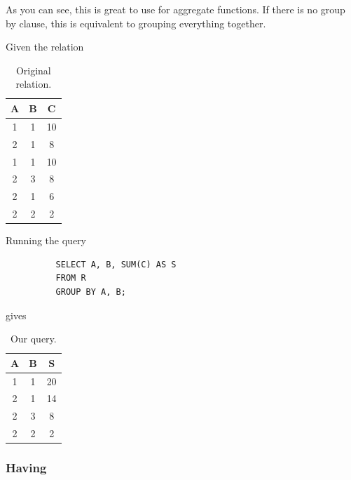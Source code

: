 \documentclass{article}
\begin{document}
      As you can see, this is great to use for aggregate functions. If there is no group by clause, this is equivalent to grouping everything together.  

      \begin{example}
        Given the relation 

        \begin{table}[H]
          \centering
          \begin{tabular}{|c|c|c|}
            \hline
            \textbf{A} & \textbf{B} & \textbf{C} \\
            \hline
            1 & 1 & 10 \\ 
            2 & 1 & 8 \\ 
            1 & 1 & 10 \\ 
            2 & 3 & 8 \\ 
            2 & 1 & 6 \\ 
            2 & 2 & 2 \\ 
            \hline
          \end{tabular}
          \caption{Original relation. }
          \label{tab:groupby}
        \end{table}
      
        Running the query 
        \begin{lstlisting}
          SELECT A, B, SUM(C) AS S 
          FROM R 
          GROUP BY A, B; 
        \end{lstlisting}
        gives 
        
        \begin{table}[H]
          \centering
          \begin{tabular}{|c|c|c|}
            \hline
            \textbf{A} & \textbf{B} & \textbf{S} \\
            \hline
            1 & 1 & 20 \\ 
            2 & 1 & 14 \\ 
            2 & 3 & 8 \\ 
            2 & 2 & 2 \\ 
            \hline
          \end{tabular}
          \caption{Our query. }
          \label{tab:groupby_output}
        \end{table}
      \end{example}

    \subsubsection{Having} 
\end{document}
